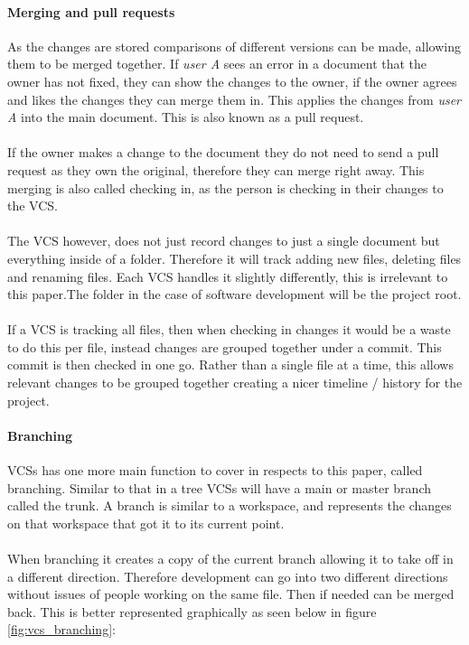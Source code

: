 \paragraph{Merging and pull requests}
As the changes are stored comparisons of different versions can be made, allowing them to be merged together. If \textit{user A} sees an error in a document that the owner has not fixed, they can show the changes to the owner, if the owner agrees and likes the changes they can merge them in. This applies the changes from \textit{user A} into the main document. This is also known as a pull request.
\\\\
If the owner makes a change to the document they do not need to send a pull request as they own the original, therefore they can merge right away. This merging is also called checking in, as the person is checking in their changes to the VCS.
\\\\
The VCS however, does not just record changes to just a single document but everything inside of a folder. Therefore it will track adding new files, deleting files and renaming files. Each VCS handles it slightly differently, this is irrelevant to this paper.The folder in the case of software development will be the project root.
\\\\
If a VCS is tracking all files, then when checking in changes it would be a waste to do this per file, instead changes are grouped together under a commit. This commit is then checked in one go. Rather than a single file at a time, this allows relevant changes to be grouped together creating a nicer timeline / history for the project.

\paragraph{Branching}
VCSs has one more main function to cover in respects to this paper, called branching. Similar to that in a tree VCSs will have a main or master branch called the trunk. A branch is similar to a workspace, and represents the changes on that workspace that got it to its current point.
\\\\
When branching it creates a copy of the current branch allowing it to take off in a different direction. Therefore development can go into two different directions without issues of people working on the same file. Then if needed can be merged back. This is better represented graphically as seen below in figure \ref{fig:vcs_branching}:

